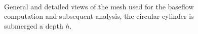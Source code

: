 \documentclass[%
 reprint,
 amsmath,amssymb,
 aps,
prl
]{revtex4-1}
\begin{document}
\begin{figure}[ht]
  \centering
     \\
    \caption{General and detailed views of the mesh used for the baseflow computation and subsequent analysis, the circular cylinder is submerged a depth $h$.}
   \label{f:geometryandmesh}                %
\end{figure}

% 
%   
\end{document}
